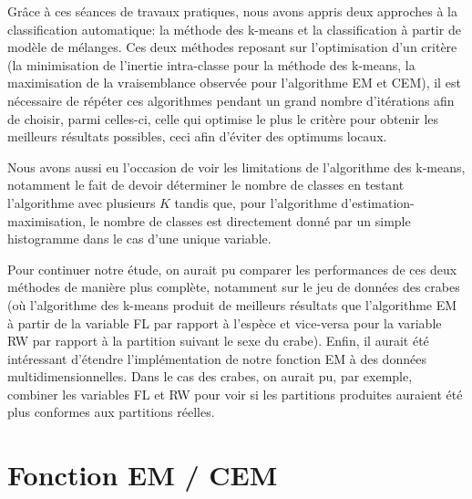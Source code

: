 \documentclass{article}
\begin{document}
\begin{multicols}{2}
Grâce à ces séances de travaux pratiques, nous avons appris deux approches à la
classification automatique: la méthode des k-means et la classification à partir
de modèle de mélanges.
Ces deux méthodes reposant sur l'optimisation d'un critère (la minimisation de
l'inertie intra-classe pour la méthode des k-means, la maximisation de la
vraisemblance observée pour l'algorithme EM et CEM), il est nécessaire de
répéter ces algorithmes pendant un grand nombre d'itérations afin de choisir,
parmi celles-ci, celle qui optimise le plus le critère pour obtenir les
meilleurs résultats possibles, ceci afin d'éviter des optimums locaux.

Nous avons aussi eu l'occasion de voir les limitations de l'algorithme des
k-means, notamment le fait de devoir déterminer le nombre de classes en testant
l'algorithme avec plusieurs $K$ tandis que, pour l'algorithme d'estimation-
maximisation, le nombre de classes est directement donné par un simple
histogramme dans le cas d'une unique variable.

Pour continuer notre étude, on aurait pu comparer les performances de ces deux
méthodes de manière plus complète, notamment sur le jeu de données des crabes
(où l'algorithme des k-means produit de meilleurs résultats que l'algorithme
EM à partir de la variable FL par rapport à l'espèce et vice-versa pour la
variable RW par rapport à la partition suivant le sexe du crabe). Enfin, il
aurait été intéressant d'étendre l'implémentation de notre fonction EM à des
données multidimensionnelles. Dans le cas des crabes, on aurait pu, par exemple,
combiner les variables FL et RW pour voir si les partitions produites auraient
été plus conformes aux partitions réelles.


\appendix

\section{Fonction EM / CEM}\label{app:em}




\end{multicols}
\end{document}
